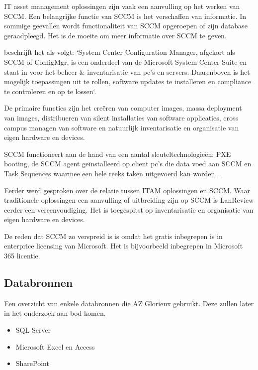 IT asset management oplossingen zijn vaak een aanvulling op het werken van SCCM. Een belangrijke functie van SCCM is het verschaffen van informatie. In sommige geevallen wordt functionaliteit van SCCM opgeroepen of zijn database geraadpleegd. Het is de moeite om meer informatie over SCCM te geven.

\textcite{Droogenbroot2016} beschrijft het als volgt: `System Center Configuration Manager, afgekort als SCCM of ConfigMgr, is een onderdeel van de Microsoft System Center Suite en staat in voor het beheer \& inventarisatie van pc's en servers. Daarenboven is het mogelijk toepassingen uit te rollen, software updates te installeren en compliance te controleren en op te lossen`.

De primaire functies zijn het creëren van computer images, massa deployment van images, distribueren van silent installaties van software applicaties, cross campus managen van software en natuurlijk inventarisatie en organisatie van eigen hardware en devices.

SCCM functioneert aan de hand van een aantal sleuteltechnologieën: PXE booting, de SCCM agent geïnstalleerd op client pc's die data voed aan SCCM en Task Sequences waarmee een hele reeks taken uitgevoerd kan worden. \autocite{Spitze2019}.

Eerder werd gesproken over de relatie tussen ITAM oplossingen en SCCM. Waar traditionele oplossingen een aanvulling of uitbreiding zijn op SCCM is LanReview eerder een vereenvoudiging. Het is toegespitst op inventarisatie en organisatie van eigen hardware en devices.

De reden dat SCCM zo verspreid is is omdat het gratis inbegrepen is in enterprice licensing van Microsoft. Het is bijvoorbeeld inbegrepen in Microsoft 365 licentie. \autocite{MicrosoftDocs2020}

\subsection{Databronnen}

Een overzicht van enkele databronnen die AZ Glorieux gebruikt. Deze zullen later in het onderzoek aan bod komen.

\begin{itemize}
    \item SQL Server
    \item Microsoft Excel en Access
    \item SharePoint
\end{itemize}

